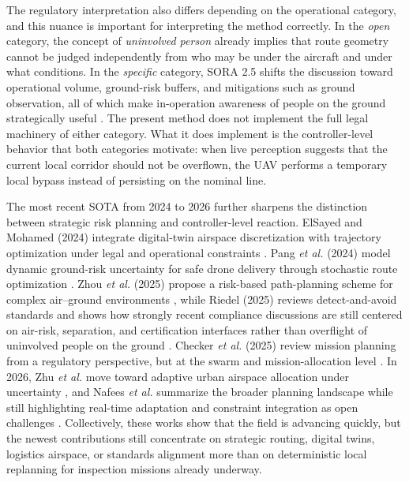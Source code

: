 \documentclass[a4paper,11pt]{article}
\begin{document}
The regulatory interpretation also differs depending on the operational category, and this nuance is important for interpreting the method correctly. In the \emph{open} category, the concept of \emph{uninvolved person} already implies that route geometry cannot be judged independently from who may be under the aircraft and under what conditions. In the \emph{specific} category, SORA 2.5 shifts the discussion toward operational volume, ground-risk buffers, and mitigations such as ground observation, all of which make in-operation awareness of people on the ground strategically useful \cite{EU2019_947,JARUS_SORA_2_5_2024,EASA_AMC_GM_SORA25_2025}. The present method does not implement the full legal machinery of either category. What it does implement is the controller-level behavior that both categories motivate: when live perception suggests that the current local corridor should not be overflown, the UAV performs a temporary local bypass instead of persisting on the nominal line.

The most recent SOTA from 2024 to 2026 further sharpens the distinction between strategic risk planning and controller-level reaction. ElSayed and Mohamed (2024) integrate digital-twin airspace discretization with trajectory optimization under legal and operational constraints \cite{elsayed2024digitaltwin}. Pang \emph{et al.} (2024) model dynamic ground-risk uncertainty for safe drone delivery through stochastic route optimization \cite{pang2024stochastic}. Zhou \emph{et al.} (2025) propose a risk-based path-planning scheme for complex air--ground environments \cite{zhou2025riskbased}, while Riedel (2025) reviews detect-and-avoid standards and shows how strongly recent compliance discussions are still centered on air-risk, separation, and certification interfaces rather than overflight of uninvolved people on the ground \cite{riedel2025daa}. Checker \emph{et al.} (2025) review mission planning from a regulatory perspective, but at the swarm and mission-allocation level \cite{checker2025regulatory}. In 2026, Zhu \emph{et al.} move toward adaptive urban airspace allocation under uncertainty \cite{zhu2026adaptive}, and Nafees \emph{et al.} summarize the broader planning landscape while still highlighting real-time adaptation and constraint integration as open challenges \cite{nafees2026review}. Collectively, these works show that the field is advancing quickly, but the newest contributions still concentrate on strategic routing, digital twins, logistics airspace, or standards alignment more than on deterministic local replanning for inspection missions already underway.
\end{document}
